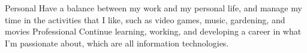 
\begin{cventries}

    \cventry
    {} %
    {Personal} %
    {}
    {}
    {Have a balance between my work and my personal life, and manage my time in the activities that I like, such as video games, music, gardening, and movies}
    \cventry
    {} %
    {Professional} %
    {}
    {}
    {Continue learning, working, and developing a career in what I’m passionate about, which are all information technologies.}
\end{cventries}